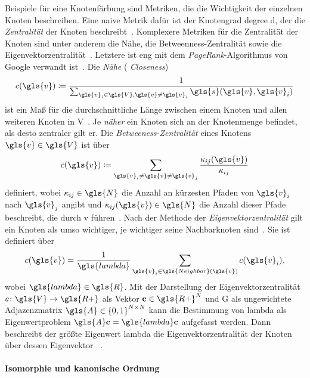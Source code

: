 Beispiele für eine Knotenfärbung sind Metriken, die die Wichtigkeit der einzelnen Knoten beschreiben.
Eine naive Metrik dafür ist \zB{} der Knotengrad \gls{degree} \bzw{} \gls{d}, der die \emph{Zentralität} der Knoten beschreibt~\cite{patchy}.
Komplexere Metriken für die Zentralität der Knoten sind unter anderem die Nähe, die Betweenness-Zentralität sowie die Eigenvektorzentralität~\cite{patchy, centrality}.
Letztere ist eng mit dem \emph{PageRank}-Algorithmus von Google verwandt ist~\cite{centrality}.
Die \emph{Nähe} (\engl{} \emph{Closeness})
\begin{equation*}
  c\left(\gls{v}\right) \coloneqq \frac{1}{\sum_{\gls{v}_i \in \gls{V}, \gls{v} \neq \gls{v}_i} \gls{s}\left(\gls{v}, \gls{v}_i\right)}
\end{equation*}
ist ein Maß für die durchschnittliche Länge zwischen einem Knoten und allen weiteren Knoten in \gls{V}~\cite{centrality}.
Je \emph{näher} ein Knoten sich an der Knotenmenge befindet, als desto zentraler gilt er.
Die \emph{Betweeness-Zentralität} eines Knotens $\gls{v} \in \gls{V}$ ist über
\begin{equation*}
  c\left(\gls{v}\right) \coloneqq \sum_{\gls{v}_i \neq \gls{v} \neq \gls{v}_j} \frac{\kappa_{ij}\left(\gls{v}\right)}{\kappa_{ij}}
\end{equation*}
definiert, wobei $\kappa_{ij} \in \gls{N}$ die Anzahl an kürzesten Pfaden von $\gls{v}_i$ nach $\gls{v}_j$ angibt und $\kappa_{ij}\left(\gls{v}\right) \in \gls{N}$ die Anzahl dieser Pfade beschreibt, die durch \gls{v} führen~\cite{centrality}.
Nach der Methode der \emph{Eigenvektorzentralität} gilt ein Knoten als umso wichtiger, je wichtiger seine Nachbarknoten sind~\cite{centrality}.
Sie ist definiert über
\begin{equation*}
  c\left(\gls{v}\right) = \frac{1}{\gls{lambda}} \sum_{\gls{v}_i \in \gls{Neighbor}\left(\gls{v}\right)} c\left(\gls{v}_i\right),
\end{equation*}
wobei $\gls{lambda} \in \gls{R}$.
Mit der Darstellung der Eigenvektorzentralität $c \colon \gls{V} \to \gls{R+}$ als Vektor $\ve{c} \in \gls{R+}^N$ und \gls{G} als ungewichtete Adjazenzmatrix $\gls{A} \in {\left\{0,1\right\}}^{N \times N}$ kann die Bestimmung von \gls{lambda} \bzw{}  als Eigenwertproblem $\gls{A}\ve{c} = \gls{lambda}\ve{c}$ aufgefasst werden.
Dann beschreibt der größte Eigenwert \gls{lambda} die Eigenvektorzentralität der Knoten über dessen Eigenvektor ~\cite{centrality}.

\paragraph{Isomorphie und kanonische Ordnung}
\label{isomorphie_und_kanonische_ordnung}

